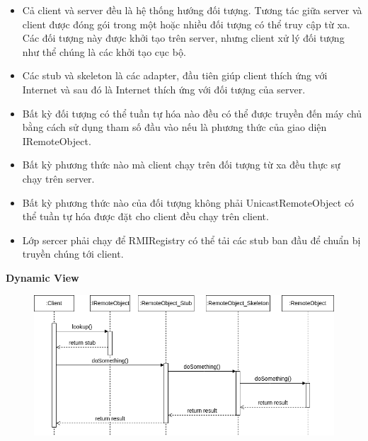 \begin{itemize}
    \item Cả client và server đều là hệ thống hướng đối tượng. Tương tác giữa server và client được đóng gói trong một hoặc nhiều đối tượng có thể truy cập từ xa. Các đối tượng này được khởi tạo trên server, nhưng client xử lý đối tượng như thể chúng là các khởi tạo cục bộ.
    \item Các stub và skeleton là các adapter, đầu tiên giúp client thích ứng với Internet và sau đó là Internet thích ứng với đối tượng của server.
    \item Bất kỳ đối tượng có thể tuần tự hóa nào đều có thể được truyền đến máy chủ bằng cách sử dụng tham số đầu vào nếu là phương thức của giao diện IRemoteObject.
    \item Bất kỳ phương thức nào mà client chạy trên đối tượng từ xa đều thực sự chạy trên server.
    \item Bất kỳ phương thức nào của đối tượng không phải UnicastRemoteObject có thể tuần tự hóa được đặt cho client đều chạy trên client.
    \item Lớp sercer phải chạy để RMIRegistry có thể tải các stub ban đầu để chuẩn bị truyền chúng tới client.
\end{itemize}

\textbf{Dynamic View}
\begin{figure}[H]
    \centering
    \includegraphics[width=0.9\linewidth]{img3.1.2/design mechanism-Page-8.drawio.png}
\end{figure}
